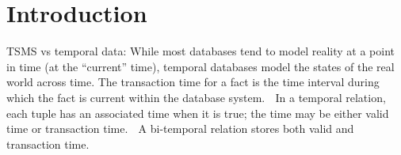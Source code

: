 


\section{Introduction}

TSMS vs temporal data: While most databases tend to model reality at a point in time (at the
“current” time), temporal databases model the states of the real world
across time.
 The transaction time for a fact is the time interval during which the fact
is current within the database system.
 In a temporal relation, each tuple has an associated time when it is true;
the time may be either valid time or transaction time.
 A bi-temporal relation stores both valid and transaction time.





















